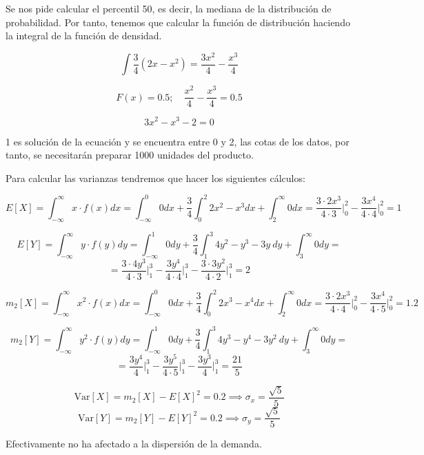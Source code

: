 \problem 
\subproblem 
Se nos pide calcular el percentil 50, es decir, la mediana de la distribución de probabilidad. Por tanto, tenemos que calcular la función de distribución haciendo la integral de la función de densidad.

$$\int \dfrac{3}{4}(2x-x^2) = \dfrac{3x^2}{4} - \dfrac{x^3}{4}$$

$$F(x) = 0.5;\quad \dfrac{x^2}{4} - \dfrac{x^3}{4} = 0.5$$

$$3x^2 - x^3 - 2 = 0$$

1 es solución de la ecuación y se encuentra entre 0 y 2, las cotas de los datos, por tanto, se necesitarán preparar 1000 unidades del producto.

\subproblem 
Para calcular las varianzas tendremos que hacer los siguientes cálculos:

$$E[X] = \int_{-\infty}^{\infty} x\cdot f(x)dx = \int_{-\infty}^0 0dx + \dfrac{3}{4} \int_0^2 2x^2 - x^3dx + \int_2^{\infty} 0dx = \dfrac{3\cdot2x^3}{4\cdot3} \biggr\rvert_0^2 - \dfrac{3x^4}{4\cdot4}\biggr\rvert_0^2 = 1$$

$$E[Y] = \int_{-\infty}^{\infty} y\cdot f(y)dy = \int_{-\infty}^1 0dy + \dfrac{3}{4} \int_1^3 4y^2 - y^3 -3y\ dy + \int_3^{\infty} 0dy = $$ 
$$= \dfrac{3\cdot4y^3}{4\cdot3} \biggr\rvert_1^3 - \dfrac{3y^4}{4\cdot4}\biggr\rvert_1^3 - \dfrac{3\cdot3y^2}{4\cdot2}\biggr\rvert_1^3= 2$$


$$m_2[X] = \int_{-\infty}^{\infty} x^2\cdot f(x)dx = \int_{-\infty}^0 0dx + \dfrac{3}{4} \int_0^2 2x^3 - x^4dx + \int_2^{\infty} 0dx = \dfrac{3\cdot2x^3}{4\cdot4} \biggr\rvert_0^2 - \dfrac{3x^4}{4\cdot5}\biggr\rvert_0^2 = 1.2$$

$$m_2[Y] = \int_{-\infty}^{\infty} y^2\cdot f(y)dy = \int_{-\infty}^1 0dy + \dfrac{3}{4} \int_1^3 4y^3 - y^4 -3y^2\ dy + \int_3^{\infty} 0dy = $$ 
$$= \dfrac{3y^4}{4} \biggr\rvert_1^3 - \dfrac{3y^5}{4\cdot5}\biggr\rvert_1^3 - \dfrac{3y^3}{4}\biggr\rvert_1^3= \dfrac{21}{5}$$

$$\mbox{Var}[X] = m_2[X] - E[X]^2 = 0.2 \implies \sigma_x = \dfrac{\sqrt{5}}{5}$$
$$\mbox{Var}[Y] = m_2[Y] - E[Y]^2 = 0.2 \implies \sigma_y = \dfrac{\sqrt{5}}{5}$$

Efectivamente no ha afectado a la dispersión de la demanda.
